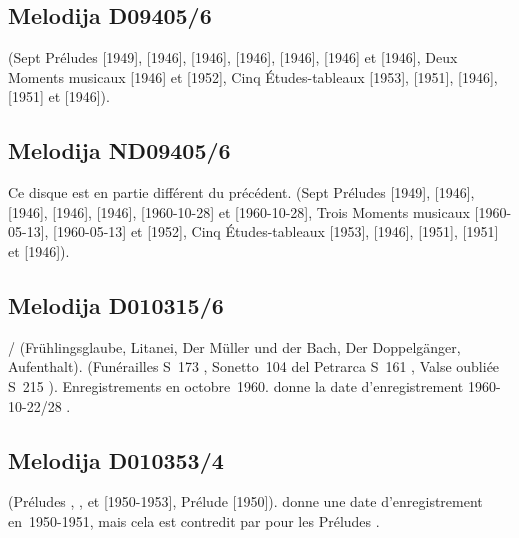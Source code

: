 \subsection{Melodija D09405/6}

\Rachmaninov{} (Sept Préludes   [1949], 
 [1946],   [1946],   [1946],
  [1946],   [1946] et 
 [1946], Deux Moments musicaux   [1946] et
  [1952], Cinq Études-tableaux  
[1953],   [1951],   [1946], 
 [1951] et   [1946]).

\subsection{Melodija ND09405/6}

Ce disque est en partie différent du précédent.
\Rachmaninov{} (Sept Préludes   [1949], 
 [1946],   [1946],   [1946],
  [1946],   [1960-10-28] et 
 [1960-10-28], Trois Moments musicaux  
[1960-05-13],   [1960-05-13] et  
[1952], Cinq Études-tableaux   [1953], 
 [1946],   [1951],   [1951]
et   [1946]).

\subsection{Melodija D010315/6}

\Schubert{}/\Liszt{} (Frühlingsglaube, Litanei, Der Müller und der Bach, Der
Doppelgänger, Aufenthalt).
\Liszt{} (Funérailles S~173 , Sonetto~104 del Petrarca S~161
, Valse oubliée  S~215 ).
Enregistrements en octobre~1960.
\INikonovich{} \citep[voir][p.~2]{Nikonovich11} donne la date
d'enregistrement 1960-10-22/28 \citep[voir aussi][p.~70]{White}.

\subsection{Melodija D010353/4}

\Chopin{} (Préludes  , ,  et
 [1950-1953], Prélude  [1950]).
\INikonovich{} \citep[voir][p.~2]{Nikonovich11} donne une date
d'enregistrement en~1950-1951, mais cela est contredit par \FMalik{}
\citep[voir][p.~66]{Malik} pour les Préludes .

